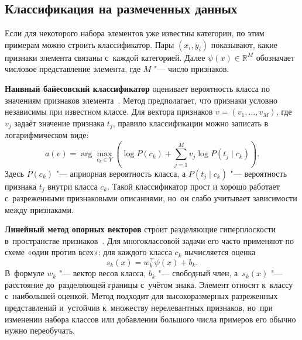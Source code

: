 \subsection{Классификация на размеченных данных}\label{subsec:ch1/classification/classification_alghorythms}\label{sec:ch1/clf}

Если для некоторого набора элементов уже известны категории, по этим примерам
можно строить классификатор. Пары \( (x_i,y_i) \) показывают, какие признаки
элемента связаны с~каждой категорией. Далее
\( \psi(x) \in \mathbb{R}^{M} \) обозначает числовое представление элемента,
где \( M \) "--- число признаков.

\textbf{Наивный байесовский классификатор} оценивает вероятность класса по
значениям признаков элемента~\autocite{McCallum1998NaiveBayes}. Метод
предполагает, что признаки условно независимы при известном классе. Для вектора
признаков \( v=(v_1,\ldots,v_M) \), где \( v_j \) задаёт значение признака
\( t_j \), правило классификации можно записать в логарифмическом виде:
\begin{equation}
    \label{eq:naive-bayes}
    a(v)=\arg\max_{c_k\in Y}
    \left(
        \log P(c_k) + \sum_{j=1}^{M} v_j \log P(t_j \mid c_k)
    \right).
\end{equation}
Здесь \( P(c_k) \) "--- априорная вероятность класса, а
\( P(t_j \mid c_k) \) "--- вероятность признака \( t_j \) внутри класса
\( c_k \). Такой классификатор прост и хорошо работает с~разреженными
признаковыми описаниями, но~он слабо учитывает зависимости между признаками.

\textbf{Линейный метод опорных векторов} строит разделяющие гиперплоскости
в~пространстве признаков~\autocite{Joachims1998SVMTextCat}. Для многоклассовой
задачи его часто применяют по схеме «один против всех»: для каждого класса
\( c_k \) вычисляется оценка
\begin{equation}
    \label{eq:linear-svm-score}
    s_k(x)=w_k^\top \psi(x)+b_k.
\end{equation}
В~формуле \( w_k \) "--- вектор весов класса, \( b_k \) "--- свободный член,
а~\( s_k(x) \) "--- расстояние до~разделяющей границы с~учётом знака. Элемент
относят к~классу с~наибольшей оценкой. Метод подходит для
высокоразмерных разреженных представлений и~устойчив к~множеству нерелевантных
признаков, но~при изменении набора классов или добавлении большого числа
примеров его обычно нужно переобучать.

